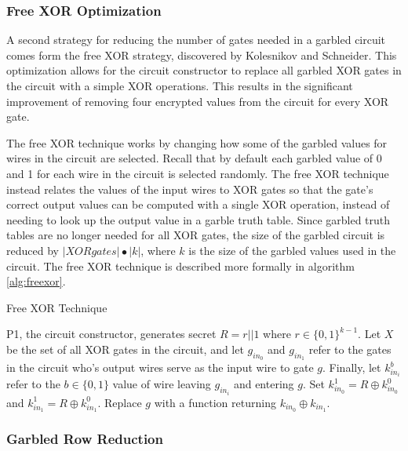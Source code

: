\subsubsection{Free XOR Optimization}

A second strategy for reducing the number of gates needed in a garbled circuit comes form the free XOR strategy, discovered by Kolesnikov and Schneider\cite{kolesnikov2008improved}.  This optimization allows for the circuit constructor to replace all garbled XOR gates in the circuit with a simple XOR operations. This results in the significant improvement of removing four encrypted values from the circuit for every XOR gate.

The free XOR technique works by changing how some of the garbled values for wires in the circuit are selected. Recall that by default each garbled value of 0 and 1 for each wire in the circuit is selected randomly.  The free XOR technique instead relates the values of the input wires to XOR gates so that the gate's correct output values can be computed with a single XOR operation, instead of needing to look up the output value in a garble truth table. Since garbled truth tables are no longer needed for all XOR gates, the size of the garbled circuit is reduced by $|XOR gates| \bullet |k|$, where $k$ is the size of the garbled values used in the circuit. The free XOR technique is described more formally in algorithm \ref{alg:freexor}.

\begin{algorithm}[H]
    \caption{Free XOR Technique}
    \label{alg:freexor}
    \begin{algorithmic}[1]
        \STATE \ac{P1}, the circuit constructor, generates secret $R = r||1$ where $r \in \{0, 1\}^{k-1}$.
        \STATE Let $X$ be the set of all XOR gates in the circuit, and let $g_{in_0}$ and $g_{in_1}$ refer to the gates in the circuit who's output wires serve as the input wire to gate $g$. Finally, let $k^b_{in_i}$ refer to the $b \in \{0, 1\}$ value of wire leaving $g_{in_i}$ and entering $g$.
            \STATE Set $k^1_{in_0} =  R \oplus k^0_{in_0}$ and $k^1_{in_1} =  R \oplus k^0_{in_1}$.
            \STATE Replace $g$ with a function returning $k_{in_0} \oplus k_{in_1}$.
        \ENDFOR
    \end{algorithmic}
\end{algorithm}


\subsubsection{Garbled Row Reduction}



